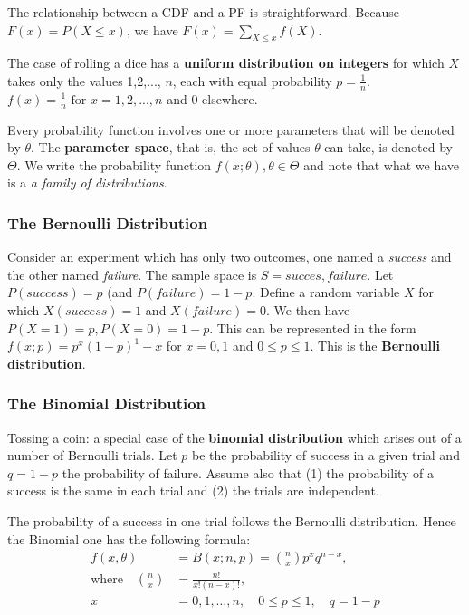 \documentclass{article}
\begin{document}
The relationship between a CDF and a PF is straightforward. Because \(F(x) = P(X \leq x)\), we have \(F(x) = \sum_{X \leq x} f(X)\).

The case of rolling a dice has a \textbf{uniform distribution on integers} for which \(X\) takes only the values 1,2,..., \(n\), each with equal probability \(p = \frac{1}{n}\). \(f(x)=\frac{1}{n} \text{ for } x=1,2,...,n\) and 0 elsewhere.

Every probability function involves one or more parameters that will be denoted by $\theta$. The \textbf{parameter space}, that is, the set of values $\theta$ can take, is denoted by $\Theta$. We write the probability function \(f(x; \theta), \theta \in \Theta\) and note that what we have is a \textit{a family of distributions}.

\subsubsection{The Bernoulli Distribution}

Consider an experiment which has only two outcomes, one named a \textit{success} and the other named \textit{failure}. The sample space is \(S={succes, failure}\). Let \(P(success)=p\) (and \(P(failure)=1-p\). Define a random variable \(X\) for which \(X(success)=1\) and \(X(failure)=0\). We then have \(P(X=1)=p, P(X=0)=1-p\). This can be represented in the form \(f(x;p)=p^x(1-p)^1-x\) for \(x=0,1\) and \(0 \leq p \leq 1\). This is the \textbf{Bernoulli distribution}.

\subsubsection{The Binomial Distribution}

Tossing a coin: a special case of the \textbf{binomial distribution} which arises out of a number of Bernoulli trials. Let \(p\) be the probability of success in a given trial and \(q=1-p\) the probability of failure. Assume also that (1) the probability of a success is the same in each trial and (2) the trials are independent.

The probability of a success in one trial follows the Bernoulli distribution. Hence the Binomial one has the following formula:
\begin{equation*}
\begin{split}
    f(x, \theta) &= B(x; n, p) = \binom{n}{x} p^x q^{n-x}, \\
    \text{where} \quad \binom{n}{x} &= \frac{n!}{x!(n-x)!}, \\
    x &= 0, 1, \ldots, n, \quad 0 \leq p \leq 1, \quad q = 1-p
\end{split}
\end{equation*}
\end{document}
